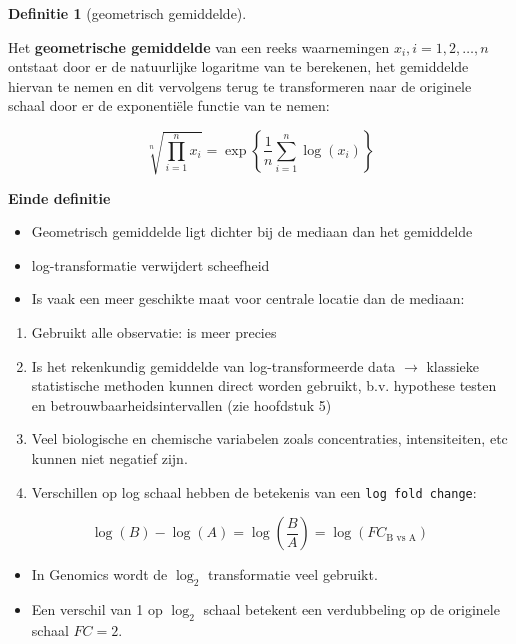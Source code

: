 \documentclass[
  12pt,dutch]{book}
\providecommand{\tightlist}{%
  \setlength{\itemsep}{0pt}\setlength{\parskip}{0pt}}
\theoremstyle{definition}
\newtheorem{definition}{Definitie}[chapter]
\theoremstyle{definition}
\theoremstyle{definition}
\theoremstyle{definition}
\theoremstyle{remark}
\begin{document}
\begin{definition}[geometrisch gemiddelde]
\protect\hypertarget{def:unnamed-chunk-99}{}\label{def:unnamed-chunk-99}~
\end{definition}

Het \textbf{geometrische gemiddelde} van een reeks waarnemingen \(x_i, i=1,
2, \dots, n\) ontstaat door er de natuurlijke logaritme van te berekenen, het
gemiddelde hiervan te nemen en dit vervolgens terug te transformeren naar de
originele schaal door er de exponentiële functie van te nemen:

\begin{equation*}
\sqrt[n]{\prod\limits_{i=1}^n x_i} = \exp\left\{\frac{1}{n} \sum_{i=1}^n \log(x_i)\right\}
\end{equation*}

\textbf{Einde definitie}

\begin{itemize}
\item
  Geometrisch gemiddelde ligt dichter bij de mediaan dan het gemiddelde
\item
  log-transformatie verwijdert scheefheid
\item
  Is vaak een meer geschikte maat voor centrale locatie dan de mediaan:
\end{itemize}

\begin{enumerate}
\def\labelenumi{\arabic{enumi}.}
\tightlist
\item
  Gebruikt alle observatie: is meer precies
\item
  Is het rekenkundig gemiddelde van log-transformeerde data \(\rightarrow\) klassieke statistische methoden kunnen direct worden gebruikt, b.v. hypothese testen en betrouwbaarheidsintervallen (zie hoofdstuk 5)
\item
  Veel biologische en chemische variabelen zoals concentraties, intensiteiten, etc kunnen niet negatief zijn.
\item
  Verschillen op log schaal hebben de betekenis van een \texttt{log\ fold\ change}:
\end{enumerate}

\[
\log (B) - \log(A)= \log(\frac{B}{A})=\log(FC_\text{B vs A})
\]

\begin{itemize}
\item
  In Genomics wordt de \(\log_2\) transformatie veel gebruikt.
\item
  Een verschil van 1 op \(\log_2\) schaal betekent een verdubbeling op de originele schaal \(FC=2\).
\end{itemize}
\end{document}
